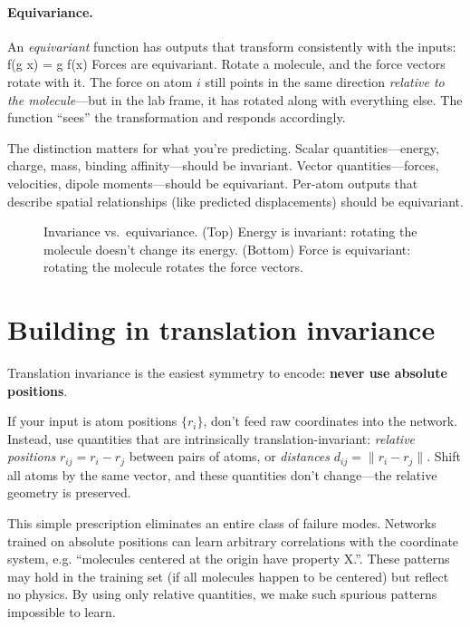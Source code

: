 \documentclass[11pt]{article}
\begin{document}
\paragraph{Equivariance.} An \emph{equivariant} function has outputs that transform consistently with the inputs:
\beq
f(g \cdot x) = g \cdot f(x)
\eeq
Forces are equivariant. Rotate a molecule, and the force vectors rotate with it. The force on atom $i$ still points in the same direction \emph{relative to the molecule}---but in the lab frame, it has rotated along with everything else. The function ``sees'' the transformation and responds accordingly.

The distinction matters for what you're predicting. Scalar quantities---energy, charge, mass, binding affinity---should be invariant. Vector quantities---forces, velocities, dipole moments---should be equivariant. Per-atom outputs that describe spatial relationships (like predicted displacements) should be equivariant.

\begin{figure}[h]
\centering

\caption{Invariance vs.\ equivariance. (Top) Energy is invariant: rotating the molecule doesn't change its energy. (Bottom) Force is equivariant: rotating the molecule rotates the force vectors.}
\label{fig:inv_equiv}
\end{figure}

\section{Building in translation invariance}

Translation invariance is the easiest symmetry to encode: \textbf{never use absolute positions}.

If your input is atom positions $\{r_i\}$, don't feed raw coordinates into the network. Instead, use quantities that are intrinsically translation-invariant: \emph{relative positions} $r_{ij} = r_i - r_j$ between pairs of atoms, or \emph{distances} $d_{ij} = \|r_i - r_j\|$. Shift all atoms by the same vector, and these quantities don't change---the relative geometry is preserved.

This simple prescription eliminates an entire class of failure modes. Networks trained on absolute positions can learn arbitrary correlations with the coordinate system, e.g. ``molecules centered at the origin have property X.''. These patterns may hold in the training set (if all molecules happen to be centered) but reflect no physics. By using only relative quantities, we make such spurious patterns impossible to learn.
\end{document}
